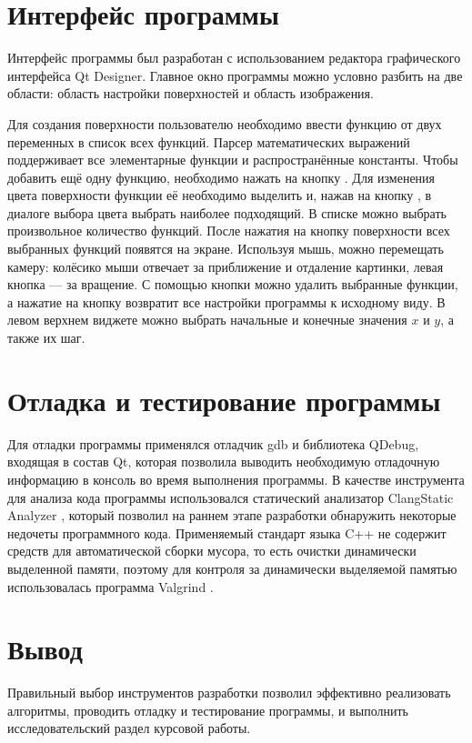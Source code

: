 
\section{Интерфейс программы}

Интерфейс программы был разработан с использованием редактора графического интерфейса Qt Designer.
Главное окно программы можно условно разбить на две области: область настройки поверхностей и область изображения.


Для создания поверхности пользователю необходимо ввести функцию от двух переменных в список всех функций.
Парсер математических выражений поддерживает все элементарные функции и распространённые константы.
Чтобы добавить ещё одну функцию, необходимо нажать на кнопку .
Для изменения цвета поверхности функции её необходимо выделить и, нажав на кнопку , в диалоге выбора цвета выбрать наиболее подходящий.
В списке можно выбрать произвольное количество функций.
После нажатия на кнопку  поверхности всех выбранных функций появятся на экране.
Используя мышь, можно перемещать камеру: колёсико мыши отвечает за приближение и отдаление картинки, левая кнопка — за вращение.
С помощью кнопки  можно удалить выбранные функции, а нажатие на кнопку  возвратит все настройки программы к исходному виду.
В левом верхнем виджете можно выбрать начальные и конечные значения $x$ и $y$, а также их шаг.


\section{Отладка и тестирование программы}

Для отладки программы применялся отладчик gdb и библиотека QDebug, входящая в состав Qt, которая позволила выводить необходимую отладочную информацию в консоль во время выполнения программы.
В качестве инструмента для анализа кода программы использовался статический анализатор ClangStatic Analyzer \cite{clang}, который позволил на раннем этапе разработки обнаружить некоторые недочеты программного кода.
Применяемый стандарт языка C++ не содержит средств для автоматической сборки мусора, то есть очистки динамически выделенной памяти, поэтому для контроля за динамически выделяемой памятью использовалась программа Valgrind \cite{valgrind}.

\section*{Вывод}

Правильный выбор инструментов разработки позволил эффективно реализовать алгоритмы, проводить отладку и тестирование программы, и выполнить исследовательский раздел курсовой работы.
